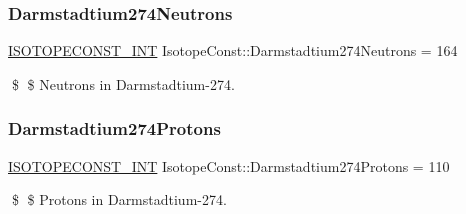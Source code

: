 \subsubsection{\texorpdfstring{Darmstadtium274\+Neutrons}{Darmstadtium274Neutrons}}
{\footnotesize\ttfamily \mbox{\hyperlink{group___isotope_const-_macros_ga5f18360b3e99483a35c32d789e62621c}{I\+S\+O\+T\+O\+P\+E\+C\+O\+N\+S\+T\+\_\+\+I\+NT}} Isotope\+Const\+::\+Darmstadtium274\+Neutrons = 164}

\$ \$ Neutrons in Darmstadtium-\/274. \mbox{\label{group___isotope_const-_darmstadtium-_ds274_gad4663fc137270b8d35aeb43e91f67083}} 
\subsubsection{\texorpdfstring{Darmstadtium274\+Protons}{Darmstadtium274Protons}}
{\footnotesize\ttfamily \mbox{\hyperlink{group___isotope_const-_macros_ga5f18360b3e99483a35c32d789e62621c}{I\+S\+O\+T\+O\+P\+E\+C\+O\+N\+S\+T\+\_\+\+I\+NT}} Isotope\+Const\+::\+Darmstadtium274\+Protons = 110}

\$ \$ Protons in Darmstadtium-\/274. 